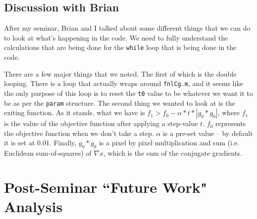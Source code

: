 \documentclass[11 pt]{article}
\let\oldsection\section
\renewcommand\section{\clearpage\newpage\oldsection}
\begin{document}
  \subsection{Discussion with Brian}

    After my seminar, Brian and I talked about some different things that we can do to look at what's happening in the code. We need to fully understand the calculations that are being done for the \texttt{while} loop that is being done in the code. 

    There are a few major things that we noted. The first of which is the double looping. There is a loop that actually wraps around \texttt{fnlCg.m}, and it seems like the only purpose of this loop is to reset the \texttt{t0} value to be whatever we want it to be as per the \texttt{param} structure. The second thing we wanted to look at is the exiting function. As it stands, what we have is $f_1 > f_0 - \alpha*t*|g_0*g_0|$, where $f_1$ is the value of the objective function after applying a step-value $t$. $f_0$ represents the objective function when we don't take a step. $\alpha$ is a pre-set value -- by default it is set at 0.01. Finally, $g_0*g_0$ is a pixel by pixel multiplication and sum (i.e. Euclidean sum-of-squares) of $\nabla x$, which is the sum of the conjugate gradients.

      

\section{Post-Seminar ``Future Work" Analysis}
\end{document}
